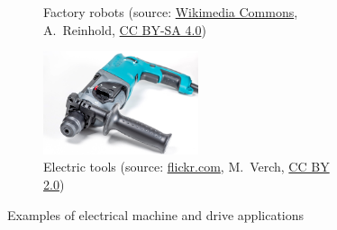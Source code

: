 \begin{frame}
\begin{figure}
\begin{subfigure}[b]{0.49\textwidth}
			\caption{Factory robots (source: \href{https://commons.wikimedia.org/wiki/File:Automatix_KukaRobot483.agr.jpg}{Wikimedia Commons}, A.~Reinhold, \href{https://creativecommons.org/licenses/by-sa/4.0/deed.en}{CC BY-SA 4.0})}
		\end{subfigure}
		\hfill
		\begin{subfigure}[b]{0.49\textwidth}
			\centering
			\includegraphics[width=0.5\textwidth]{fig/lec01/electric_drill.jpg}
			\caption{Electric tools (source: \href{https://www.flickr.com/photos/30478819@N08/49940384798}{flickr.com},  M.~Verch, \href{https://creativecommons.org/licenses/by/2.0/}{CC BY 2.0})}
		\end{subfigure}
		\caption*{Examples of electrical machine and drive applications} 
        \label{fig:examples_machine_drives_01}
	\end{figure}
\end{frame}


